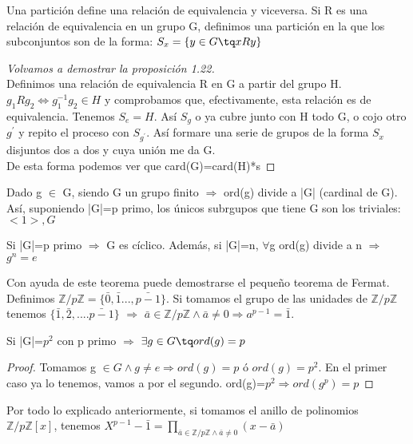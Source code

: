 \documentclass[a4paper,10pt]{apuntes}
\begin{document}
  Una partición define una relación de equivalencia y viceversa. Si R es una relación de equivalencia en un grupo G, 
  definimos una partición en la que los subconjuntos son de la forma: $S_{x}=\{y\in G \tq xRy\}$
  
  \begin{proof}[Volvamos a demostrar la proposición 1.22]
   \\Definimos una relación de equivalencia R en G a partir del grupo H.
   $g_{1}Rg_{2} \Leftrightarrow g_{1}^{-1}g_{2}\in H$  y comprobamos que, efectivamente, esta relación es de equivalencia.
   Tenemos $S_{e}=H$. Así $S_{g}$  o ya cubre junto con H todo G, o cojo otro $g^{'}$  y repito el proceso con $S_{g^{'}}$.
   Así formare una serie de grupos de la forma $S_{x}$  disjuntos dos a dos y cuya unión me da G.\\
   De esta forma podemos ver que card(G)=card(H)*s
  \end{proof}
  
  \begin{corol}
   Dado g $\in$ G, siendo G un grupo finito $\Rightarrow$  ord(g) divide a |G| (cardinal de G). Así, suponiendo |G|=p primo,
   los únicos subrgupos que tiene G son los triviales: $<1>, G$
  \end{corol}
  \begin{theorem}
   Si |G|=p primo $\Rightarrow$  G es cíclico. Además, si |G|=n, $\forall$g ord(g) divide a n $\Rightarrow$  $g^{n}=e$
  \end{theorem}
  \begin{example}
   Con ayuda de este teorema puede demostrarse el pequeño teorema de Fermat. 
   Definimos $\mathds{Z}/p\mathds{Z}=\{\bar{0},\bar{1}...,\bar{p-1}\}$.
   Si tomamos el grupo de las unidades de $\mathds{Z}/p\mathds{Z}$ tenemos $\{\bar{1}, \bar{2},....\bar{p-1}\}$ $\Rightarrow$
   $\bar{a}\in\mathds{Z}/p\mathds{Z} \wedge \bar{a}\neq 0 \Rightarrow a^{p-1}=\bar{1}$.
  \end{example}
  \begin{theorem}
   Si |G|=$p^{2}$  con p primo $\Rightarrow$  $\exists g \in G \tq ord(g)=p$
  \end{theorem}
  \begin{proof}
   Tomamos g $\in G \wedge g\neq e \Rightarrow ord(g)=p$  ó $ord(g)=p^{2}$. En el primer caso ya lo tenemos, vamos a por el segundo.
   ord(g)=$p^{2}\Rightarrow ord(g^{p})=p$
  \end{proof}
  \begin{example}
   Por todo lo explicado anteriormente, si tomamos el anillo de polinomios $\mathds{Z}/p\mathds{Z}[x]$, tenemos $X^{p-1}-\bar{1}=
   \prod_{\bar{a}\in\mathds{Z}/p\mathds{Z} \wedge \bar{a}\neq 0}(x-\bar{a})$
  \end{example}
  
\end{document}
